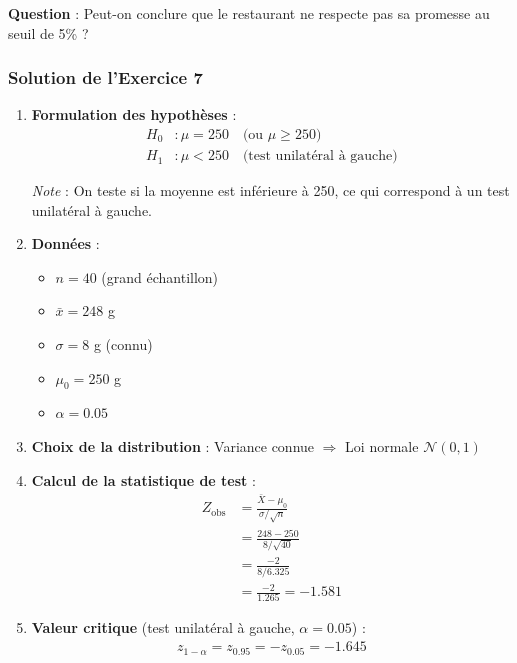 \documentclass[11pt,a4paper]{article}
\newcommand{\N}{\mathcal{N}}
\begin{document}
\textbf{Question} : Peut-on conclure que le restaurant ne respecte pas sa promesse au seuil de 5\% ?

\subsubsection*{Solution de l'Exercice 7}

\begin{enumerate}
    \item \textbf{Formulation des hypothèses} :
    \begin{align*}
    H_0 &: \mu = 250 \quad \text{(ou } \mu \geq 250\text{)} \\
    H_1 &: \mu < 250 \quad \text{(test unilatéral à gauche)}
    \end{align*}
    
    \textit{Note} : On teste si la moyenne est inférieure à 250, ce qui correspond à un test unilatéral à gauche.
    
    \item \textbf{Données} :
    \begin{itemize}
        \item $n = 40$ (grand échantillon)
        \item $\bar{x} = 248$ g
        \item $\sigma = 8$ g (connu)
        \item $\mu_0 = 250$ g
        \item $\alpha = 0.05$
    \end{itemize}
    
    \item \textbf{Choix de la distribution} : Variance connue $\Rightarrow$ Loi normale $\N(0,1)$
    
    \item \textbf{Calcul de la statistique de test} :
    \begin{align*}
    Z_{\text{obs}} &= \frac{\bar{X} - \mu_0}{\sigma/\sqrt{n}} \\
    &= \frac{248 - 250}{8/\sqrt{40}} \\
    &= \frac{-2}{8/6.325} \\
    &= \frac{-2}{1.265} = -1.581
    \end{align*}
    
    \item \textbf{Valeur critique} (test unilatéral à gauche, $\alpha = 0.05$) :
    \begin{align*}
    z_{1-\alpha} = z_{0.95} = -z_{0.05} = -1.645
    \end{align*}
    

\end{enumerate}
\end{document}
